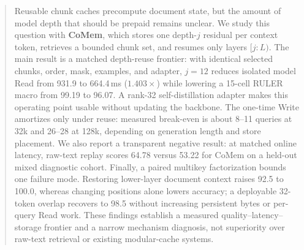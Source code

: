 \begin{abstract}
Reusable chunk caches precompute document state, but the amount of model depth
that should be prepaid remains unclear. We study this question with
\textbf{CoMem}, which stores one depth-$j$ residual per context token, retrieves
a bounded chunk set, and resumes only layers $[j{:}L)$. The main result is a
matched depth-reuse frontier: with identical selected chunks, order, mask,
examples, and adapter, $j{=}12$ reduces isolated model Read from 931.9 to
664.4\,ms ($1.403\times$) while lowering a 15-cell RULER macro from 99.19 to
96.07. A rank-32 self-distillation adapter makes this operating point usable
without updating the backbone. The one-time Write amortizes only under reuse:
measured break-even is about 8--11 queries at 32k and 26--28 at 128k, depending
on generation length and store placement. We also report a transparent negative
result: at matched online latency, raw-text replay scores 64.78 versus 53.22 for
CoMem on a held-out mixed diagnostic cohort. Finally, a paired multikey
factorization bounds one failure mode. Restoring lower-layer document context
raises 92.5 to 100.0, whereas changing positions alone lowers accuracy; a
deployable 32-token overlap recovers to 98.5 without increasing persistent bytes
or per-query Read work. These findings establish a measured
quality--latency--storage frontier and a narrow mechanism diagnosis, not
superiority over raw-text retrieval or existing modular-cache systems.
\end{abstract}
